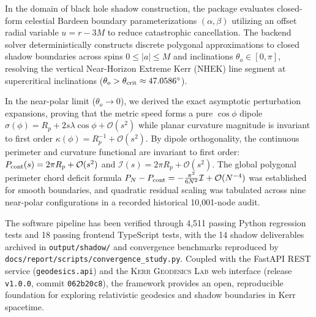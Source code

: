 In the domain of black hole shadow construction, the package evaluates closed-form celestial Bardeen boundary parameterizations $(\alpha, \beta)$ utilizing an offset radial variable $u = r - 3M$ to reduce catastrophic cancellation. The backend solver deterministically constructs discrete polygonal approximations to closed shadow boundaries across spins $0 \le |a| \le M$ and inclinations $\theta_o \in [0, \pi]$, resolving the vertical Near-Horizon Extreme Kerr (NHEK) line segment at supercritical inclinations ($\theta_o > \theta_{\rm crit} \approx 47.0586^\circ$).

In the near-polar limit ($\theta_o \to 0$), we derived the exact asymptotic perturbation expansions, proving that the metric speed forms a pure $\cos\phi$ dipole $\sigma(\phi) = R_p + 2s\lambda\cos\phi + \mathcal{O}(s^2)$ while planar curvature magnitude is invariant to first order $\kappa(\phi) = R_p^{-1} + \mathcal{O}(s^2)$. By dipole orthogonality, the continuous perimeter and curvature functional are invariant to first order: $P_{\rm cont}(s) = 2\pi R_p + \mathcal{O}(s^2)$ and $\mathcal{I}(s) = 2\pi R_p + \mathcal{O}(s^2)$. The global polygonal perimeter chord deficit formula $P_N - P_{\rm cont} = -\frac{\pi^2}{6N^2}\mathcal{I} + \mathcal{O}(N^{-4})$ was established for smooth boundaries, and quadratic residual scaling was tabulated across nine near-polar configurations in a recorded historical 10,001-node audit.

The software pipeline has been verified through 4,511 passing Python regression tests and 18 passing frontend TypeScript tests, with the 14 shadow deliverables archived in \texttt{output/shadow/} and convergence benchmarks reproduced by \texttt{docs/report/scripts/convergence\_study.py}. Coupled with the FastAPI REST service (\texttt{geodesics.api}) and the \textsc{Kerr Geodesics Lab} web interface (release \texttt{v1.0.0}, commit \texttt{062b20c8}), the framework provides an open, reproducible foundation for exploring relativistic geodesics and shadow boundaries in Kerr spacetime.
